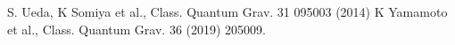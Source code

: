 
\begin{thebibliography}{9}
 S. Ueda, K Somiya et al., Class. Quantum Grav. 31 095003 (2014)
 K Yamamoto et al., Class. Quantum Grav. 36 (2019) 205009.
\end{thebibliography}

